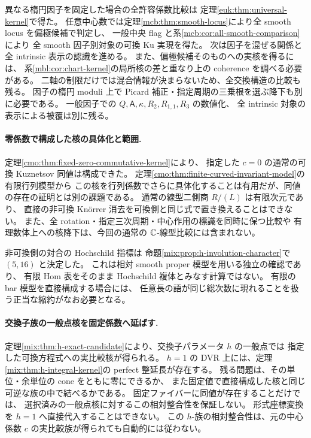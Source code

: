 異なる楕円因子を固定した場合の全許容係数比較は
定理\ref{euk:thm:universal-kernel}で得た。
任意中心数では定理\ref{mcb:thm:smooth-locus}により全 smooth locus を偏極候補で判定し、
一般中央 flag と系\ref{mcb:cor:all-smooth-comparison}により
全 smooth 因子別対象の可換 Ku 実現を得た。
次は因子を混ぜる関係と全 intrinsic 表示の認識を進める。
また、偏極候補そのものへの実核を得るには、
系\ref{mbl:cor:chart-kernel}の局所核の差と重なり上の coherence を調べる必要がある。
二軸の制限だけでは混合情報が決まらないため、全交換構造の比較も残る。
因子の楕円 moduli 上で Picard 補正・指定周期の三乗根を選ぶ降下も別に必要である。
一般因子での $Q,\mathsf A,\kappa,R_2,R_{1,1},R_3$ の数値化、
全 intrinsic 対象の表示による被覆は別に残る。

\paragraph{零係数で構成した核の具体化と範囲.}
定理\ref{cmo:thm:fixed-zero-commutative-kernel}により、
指定した $c=0$ の通常の可換 Kuznetsov 同値は構成できた。
定理\ref{cmo:thm:finite-curved-invariant-model}の有限行列模型から
この核を行列係数でさらに具体化することは有用だが、同値の存在の証明とは別の課題である。
通常の線型二側商 $R/(L)$ は有限次元であり、
直接の非可換 Kn\"orrer 消去を可換側と同じ式で置き換えることはできない。
また、全 rotation・指定三次周期・中心作用の標識を同時に保つ比較や
有理数体上への核降下は、今回の通常の $\mathbb C$-線型比較には含まれない。

非可換側の対合の Hochschild 指標は
命題\ref{mix:prop:h-involution-character}で $(5,16)$ と決定した。
これは相対 smooth proper 模型を用いる独立の確認であり、
有限 Hom 表をそのまま Hochschild 複体とみなす計算ではない。
有限の bar 模型を直接構成する場合には、
任意長の語が同じ総次数に現れることを扱う正当な縮約がなお必要となる。

\paragraph{交換子族の一般点核を固定係数へ延ばす.}
定理\ref{mix:thm:h-exact-candidate}により、交換子パラメータ $h$ の一般点では
指定した可換方程式への実比較核が得られる。
$h=1$ の DVR 上には、定理\ref{mix:thm:h-integral-kernel}の
perfect 整延長が存在する。
残る問題は、その単位・余単位の cone をともに零にできるか、
また固定値で直接構成した核と同じ可逆な族の中で結べるかである。
固定ファイバーに同値が存在することだけでは、
選択済みの一般点核に対するこの相対整合性を保証しない。
形式座標変換を $h=1$ へ直接代入することはできない。
この $h$-族の相対整合性は、元の中心係数 $c$ の実比較族が得られても自動的には従わない。

